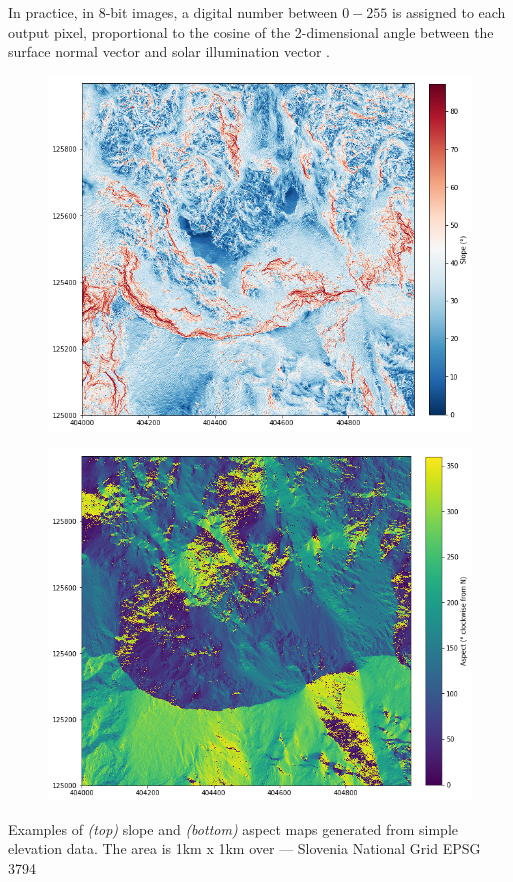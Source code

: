 In practice, in 8-bit images, a digital number between $0-255$ is assigned to each output pixel, proportional to the cosine of the 2-dimensional angle between the surface normal vector and solar illumination vector \citep{corripio2003vectorial}. 


\begin{pagemap}
\centering
\begin{subfigure}{0.76\linewidth}
\includegraphics[width = \textwidth]{images/maps/slopemap.png}
\subcaption{ } \label{slope}
\end{subfigure}

\begin{subfigure}{0.76\linewidth}
\includegraphics[width = \textwidth]{images/maps/aspectmap.png}
\subcaption{ } \label{aspect}
\end{subfigure}

\caption[Slope and Aspect maps]{Examples of  \emph{(top)} slope and  \emph{(bottom)} aspect maps generated from simple elevation data. The area is 1km x 1km over \protect{} --- Slovenia National Grid EPSG 3794}
\end{pagemap}







